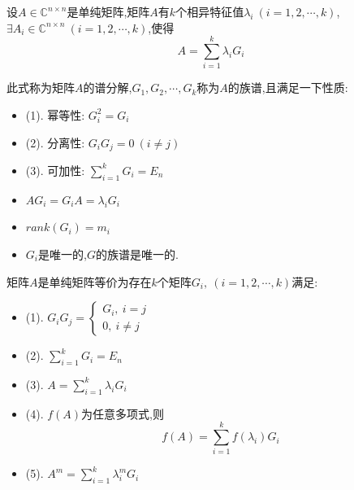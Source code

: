 \begin{theorem}[谱分解定理]\label{the: 谱分解定理}
	设$A\in\mathbb{C}^{n\times n}$是单纯矩阵,矩阵$A$有$k$个相异特征值$\lambda_{i}\ (i=1,2,\cdots,k)$,$\exists A_{i}\in \mathbb{C}^{n\times n}\ (i=1,2,\cdots,k)$,使得
	$$A=\sum\limits_{i=1}^{k}\lambda_{i}G_{i}$$
	
	此式称为矩阵$A$的谱分解,$G_{1},G_{2},\cdots,G_{k}$称为$A$的族谱,且满足一下性质:  
	\begin{property}[谱分解谱族$G_{i}$性质]
		\begin{itemize}
			\item (1). 幂等性:  $G_{i}^2=G_{i}$
			\item (2). 分离性:  $G_{i}G_{j}=0\ (i\neq j)$
			\item (3). 可加性:  $\sum\limits_{i=1}^{k}G_{i}=E_{n}$
		\end{itemize}
	\end{property}
	\begin{corollary}[谱族$G_{i}$推论]
		\begin{itemize}
			\item $AG_{i}=G_{i}A=\lambda_{i}G_{i}$
			\item $rank(G_{i})=m_{i}$
			\item $G_{i}$是唯一的,$G$的族谱是唯一的.
		\end{itemize}
	\end{corollary}
	\begin{proposition}
		矩阵$A$是单纯矩阵等价为存在$k$个矩阵$G_{i},\ (i=1,2,\cdots,k)$满足:  
		\begin{itemize}
			\item (1). $G_{i}G_{j}=\left\lbrace
			\begin{array}{l}
				G_{i},\ i=j\\0,\ i\neq j
			\end{array}
			\right. $
			\item (2). $\sum\limits_{i=1}^{k}G_{i}=E_{n}$
			\item (3). $A=\sum\limits_{i=1}^{k}\lambda_{i}G_{i}$
			\item (4). $f(A)$为任意多项式,则$$f(A)=\sum\limits_{i=1}^{k}f(\lambda_{i})G_{i}$$
			\item (5). $A^m=\sum\limits_{i=1}^{k}\lambda_{i}^mG_{i}$
		\end{itemize}
	\end{proposition}
\end{theorem}
